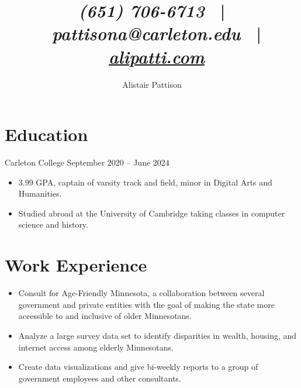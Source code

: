 \documentclass{ali-resume}
\author{Alistair Pattison}
\title{
{\it (651) 706-6713}
\ | \
{\it pattisona@carleton.edu}
\ | \
\href{http://alipatti.com}{\it alipatti.com}
}
\begin{document}
\maketitle

\section{Education}

{Carleton College}
{September 2020 -- June 2024}

\begin{itemize}
	\item 3.99 GPA, captain of varsity track and field, minor in Digital Arts and Humanities.
	\item Studied abroad at the University of Cambridge taking classes in computer science and history.
\end{itemize}

%

\section{Work Experience}


\begin{itemize}
	\item Consult for Age-Friendly Minnesota, a collaboration between several government and private entities with the goal of making the state more accessible to and inclusive of older Minnesotans.
	\item Analyze a large survey data set to identify disparities in wealth, housing, and internet access among elderly Minnesotans.
	\item Create data visualizations and give bi-weekly reports to a group of government employees and other consultants.
\end{itemize}
\end{document}
